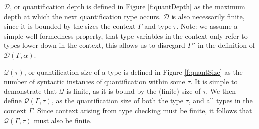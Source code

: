 \documentclass[runningheads]{llncs}
\begin{document}
$\mathcal{D}$, or quantification depth is defined in Figure \ref{f:quantDepth} as the maximum depth at which the next 
quantification type occurs. $\mathcal{D}$ is also necessarily finite, since it is bounded by the sizes the context $\Gamma$ 
and type $\tau$. Note: we assume a simple well-formedness property, that type variables in the context only refer to 
types lower down in the context, this allows us to disregard $\Gamma''$ in the definition of $\mathcal{D}(\Gamma, \alpha)$.

$\mathcal{Q}(\tau)$, or quantification size of a type is defined in Figure \ref{f:quantSize} as the number of syntactic instances of quantification 
within some $\tau$. It is simple to demonstrate that $\mathcal{Q}$ is finite, as it is bound by the (finite) size of $\tau$.
We then define $\mathcal{Q}(\Gamma, \tau)$, as 
the quantification size of both the type $\tau$, and all types in the context $\Gamma$. Since context arising from 
type checking must be finite, it follows that $\mathcal{Q}(\Gamma, \tau)$ must also be finite.
\end{document}

